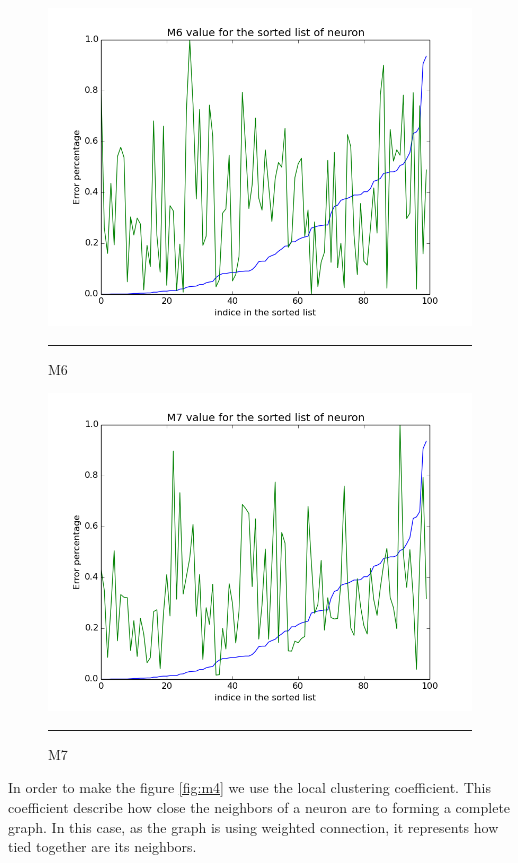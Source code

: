 \begin{figure}[!htb]
    \centering
    \includegraphics[scale=0.5]{Figures/m6.png}
    \rule{35em}{0.5pt}
    \caption[M6]{M6}
    \label{fig:m6}
\end{figure}


\begin{figure}[!htb]
    \centering
    \includegraphics[scale=0.5]{Figures/m7.png}
    \rule{35em}{0.5pt}
    \caption[M7]{M7}
    \label{fig:m7}
\end{figure}

\newpage

In order to make the figure \ref{fig:m4} we use the local clustering coefficient. This coefficient describe how close the neighbors of a neuron are to forming a complete graph. In this case, as the graph is using weighted connection, it represents how tied together are its neighbors. 


